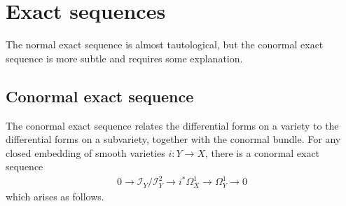 \documentclass[12pt]{article}
\begin{document}
\section{Exact sequences}
The normal exact sequence is almost tautological, but the conormal exact sequence is more subtle and requires some explanation.
\subsection{Conormal exact sequence}
The conormal exact sequence relates the differential forms on a variety to the differential forms on a subvariety, together with the conormal bundle. For any closed embedding of smooth varieties $i: Y \to X$, there is a conormal exact sequence
\begin{align*}
    0 \to \mathcal{I}_Y/\mathcal{I}_Y^2 \to i^*\Omega^1_X \to \Omega^1_Y \to 0
\end{align*} which arises as follows. 
\end{document}
